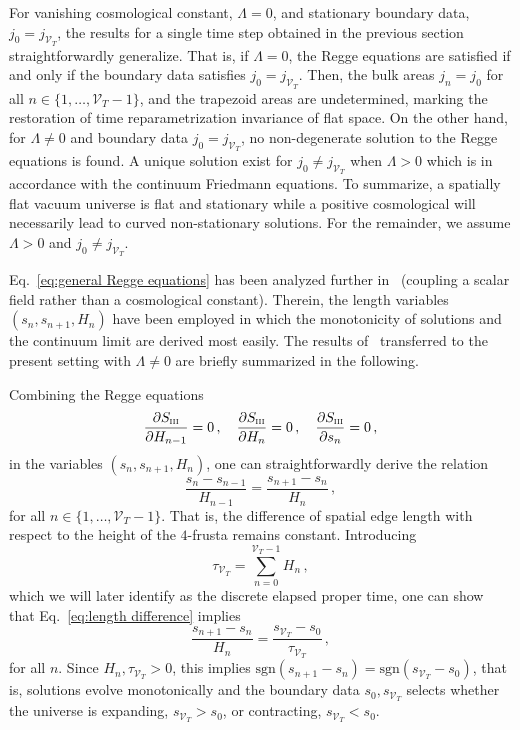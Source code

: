 \documentclass[amsmath,amssymb,aps,twocolumn,superscriptaddress,nofootinbib]{revtex4-1}
\begin{document}
For vanishing cosmological constant, $\Lambda = 0$, and stationary boundary data, $j_0=j_{\mathcal{V}_T}$, the results for a single time step obtained in the previous section straightforwardly generalize.
That is, if $\Lambda = 0$, the Regge equations are satisfied if and only if the boundary data satisfies $j_0 = j_{\mathcal{V}_T}$.
Then, the bulk areas $j_n = j_0$ for all $n\in\{1,\dots,\mathcal{V}_T-1\}$, and the trapezoid areas are undetermined, marking the restoration of time reparametrization invariance of flat space. 
On the other hand, for $\Lambda \neq 0$ and boundary data $j_0 = j_{\mathcal{V}_T}$, no non-degenerate solution to the Regge equations is found.
A unique solution exist for $j_0 \neq j_{\mathcal{V}_T}$ when $\Lambda > 0$ which is in accordance with the continuum Friedmann equations.
To summarize, a spatially flat vacuum universe is flat and stationary while a positive cosmological will necessarily lead to curved non-stationary solutions. 
For the remainder, we assume $\Lambda > 0$ and $j_0\neq j_{\mathcal{V}_T}$.

Eq.~\eqref{eq:general Regge equations} has been analyzed further in~\cite{Jercher:2023csk} (coupling a scalar field rather than a cosmological constant).
Therein, the length variables $(s_n,s_{n+1},H_n)$ have been employed in which the monotonicity of solutions and the continuum limit are derived most easily.
The results of~\cite{Jercher:2023csk} transferred to the present setting with $\Lambda\neq 0$ are briefly summarized in the following.

Combining the Regge equations
%
\begin{equation}
\pdv{S_{\textsc{iii}}}{H_{n-1}} = 0\,,\quad \pdv{S_{\textsc{iii}}}{H_{n}} = 0\,,\quad \pdv{S_{\textsc{iii}}}{s_{n}} = 0\,,
\end{equation}
%
in the variables $(s_n,s_{n+1},H_n)$, one can straightforwardly derive the relation~\cite{Jercher:2023csk}
%
\begin{equation}\label{eq:length difference}
\frac{s_n - s_{n-1}}{H_{n-1}} = \frac{s_{n+1} - s_n}{H_n}\,,
\end{equation}
%
for all $n\in\{1,\dots, \mathcal{V}_T-1\}$.
That is, the difference of spatial edge length with respect to the height of the $4$-frusta remains constant. 
Introducing 
%
\begin{equation}
\tau_{\mathcal{V}_T} = \sum_{n=0}^{\mathcal{V}_T-1}H_n\,,
\end{equation}
%
which we will later identify as the discrete elapsed proper time,  one can show that Eq.~\eqref{eq:length difference} implies
%
\begin{equation}
\frac{s_{n+1}-s_n}{H_n} = \frac{s_{\mathcal{V}_T} - s_0}{\tau_{\mathcal{V}_T}}\,,
\end{equation}
%
for all $n$.
Since $H_n,\tau_{\mathcal{V}_T} > 0$, this implies $\mathrm{sgn}(s_{n+1}-s_n) = \mathrm{sgn}(s_{\mathcal{V}_T}-s_0)$, that is, solutions evolve monotonically and the boundary data $s_0,s_{\mathcal{V}_T}$ selects whether the universe is expanding, $s_{\mathcal{V}_T}>s_0$, or contracting, $s_{\mathcal{V}_T} < s_0$.
\end{document}
